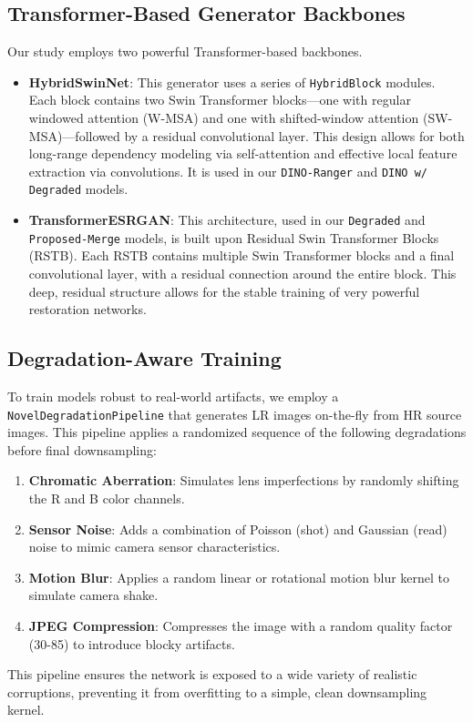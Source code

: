 \documentclass[10pt,twocolumn,letterpaper]{article}
\begin{document}
\subsection{Transformer-Based Generator Backbones}
Our study employs two powerful Transformer-based backbones.
\begin{itemize}
    \item \textbf{HybridSwinNet}: This generator uses a series of \texttt{HybridBlock} modules. Each block contains two Swin Transformer blocks—one with regular windowed attention (W-MSA) and one with shifted-window attention (SW-MSA)—followed by a residual convolutional layer. This design allows for both long-range dependency modeling via self-attention and effective local feature extraction via convolutions. It is used in our \texttt{DINO-Ranger} and \texttt{DINO w/ Degraded} models.
    \item \textbf{TransformerESRGAN}: This architecture, used in our \texttt{Degraded} and \texttt{Proposed-Merge} models, is built upon Residual Swin Transformer Blocks (RSTB). Each RSTB contains multiple Swin Transformer blocks and a final convolutional layer, with a residual connection around the entire block. This deep, residual structure allows for the stable training of very powerful restoration networks.
\end{itemize}

\subsection{Degradation-Aware Training}
To train models robust to real-world artifacts, we employ a \texttt{NovelDegradationPipeline} that generates LR images on-the-fly from HR source images. This pipeline applies a randomized sequence of the following degradations before final downsampling:
\begin{enumerate}
    \item \textbf{Chromatic Aberration}: Simulates lens imperfections by randomly shifting the R and B color channels.
    \item \textbf{Sensor Noise}: Adds a combination of Poisson (shot) and Gaussian (read) noise to mimic camera sensor characteristics.
    \item \textbf{Motion Blur}: Applies a random linear or rotational motion blur kernel to simulate camera shake.
    \item \textbf{JPEG Compression}: Compresses the image with a random quality factor (30-85) to introduce blocky artifacts.
\end{enumerate}
This pipeline ensures the network is exposed to a wide variety of realistic corruptions, preventing it from overfitting to a simple, clean downsampling kernel.
\end{document}

